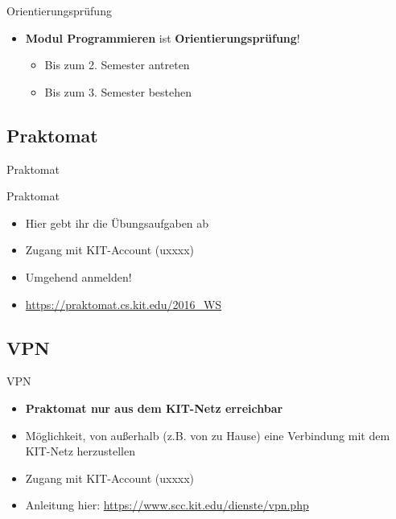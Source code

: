 \documentclass[18pt]{beamer}
\begin{document}
\begin{frame}{Orientierungsprüfung}
    \begin{itemize}
        \item \textbf{Modul Programmieren} ist \textbf{Orientierungsprüfung}!
        \begin{itemize}
            \item Bis zum 2. Semester antreten
            \item Bis zum 3. Semester bestehen
        \end{itemize}

    \end{itemize}
\end{frame}


\subsection{Praktomat}

\begin{frame}{Praktomat}
    \begin{block}{Praktomat}
        \begin{itemize}
            \item Hier gebt ihr die Übungsaufgaben ab
            \item Zugang mit KIT-Account (uxxxx)
            \item \alert{Umgehend anmelden!}
            \item \url{https://praktomat.cs.kit.edu/2016_WS}
        \end{itemize}
    \end{block}

\end{frame}


\subsection{VPN}

\begin{frame}{VPN}
    \begin{itemize}
        \item \textbf{\alert{Praktomat nur aus dem KIT-Netz erreichbar}}
        \item Möglichkeit, von außerhalb (z.B. von zu Hause) eine Verbindung mit dem KIT-Netz herzustellen
        \item Zugang mit KIT-Account (uxxxx)
        \item Anleitung hier: \url{https://www.scc.kit.edu/dienste/vpn.php}
    \end{itemize}
\end{frame}
\end{document}
